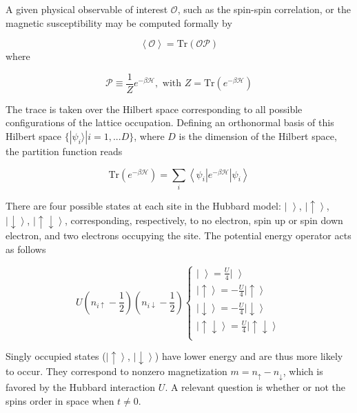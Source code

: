 A given physical observable of interest $\mathcal{O}$, such as the spin-spin correlation, or the magnetic susceptibility may be computed formally by

\begin{equation}
\left\langle \mathcal{O} \right\rangle = \text{Tr} ( \mathcal{O} \mathcal{P} )
\end{equation}
where

\begin{equation}\label{eq:projection}
\mathcal{P} \equiv \frac{1}{Z} e^{-\beta \mathcal{H} } , \text{ with } Z = \text{Tr} ( e^{-\beta \mathcal{H} } )
\end{equation}

The trace is taken over the Hilbert space corresponding to all possible configurations of the lattice occupation. Defining an orthonormal basis of this Hilbert space $\{ | \psi_i \rangle | i = 1, ... D \} $, where $D$ is the dimension of the Hilbert space, the partition function reads

\begin{equation}\label{eq:z_asEigen}
\text{Tr} ( e^{-\beta \mathcal{H} } )= \sum_i \left\langle \psi_i | e^{-\beta \mathcal{H} } | \psi_i \right\rangle
\end{equation}

There are four possible states at each site in the Hubbard model: $\left| \,\, \right\rangle$, $\left|\uparrow \right\rangle$, $\left|\downarrow\right \rangle$, $\left|\uparrow \downarrow \right\rangle $, corresponding, respectively, to no electron, spin up or spin down electron, and two electrons occupying the site. The potential energy operator acts as follows

\begin{equation}
U (n_{i\uparrow} - \frac{1}{2} ) ( n_{i\downarrow} - \frac{1}{2} ) 
\begin{cases}
\left| \,\, \right\rangle = \frac{U}{4} \left| \,\, \right\rangle \\
\left|\uparrow \right\rangle = -\frac{U}{4} \left|\uparrow \right\rangle \\
\left|\downarrow\right \rangle = -\frac{U}{4} \left|\downarrow\right \rangle \\
\left|\uparrow \downarrow \right\rangle = \frac{U}{4} \left|\uparrow \downarrow \right\rangle \\
\end{cases}
\end{equation}

Singly occupied states ($\left|\uparrow \right\rangle$, $\left|\downarrow\right \rangle$) have lower energy and are thus more likely to occur. They correspond to nonzero magnetization $m = n_{\uparrow} - n_{\downarrow}$, which is favored by the Hubbard interaction $U$. A relevant question is whether or not the spins order in space when $t \neq 0$.

